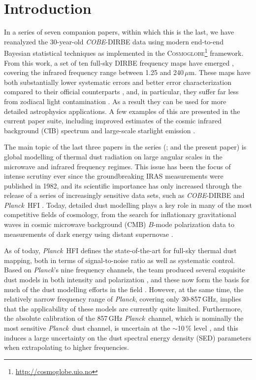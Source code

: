 \documentclass{aa}
\def\Cosmoglobe{\textsc{Cosmoglobe}}
\def\Planck{\textit{Planck}}
\def\COBE{\textit{COBE}}
\begin{document}
   
\section{Introduction}

In a series of seven companion papers, within which this is the last,
we have reanalyzed the 30-year-old \COBE-DIRBE data using modern
end-to-end Bayesian statistical techniques as implemented in the
\Cosmoglobe\footnote{\url{http://cosmoglobe.uio.no}} framework. From this work, a set of ten
full-sky DIRBE frequency maps have emerged \citep{CG02_01}, covering the infrared frequency range
between 1.25 and 240\,$\mu$m. These maps have both substantially lower
systematic errors and better error characterization compared to their
official counterparts \citep{hauser1998,CG02_01}, and, in particular,
they suffer far less from zodiacal light contamination
\citep{K98,CG02_02}. As a result they can be used for more detailed
astrophysics applications. A few examples of this are presented in the
current paper suite, including improved estimates of the cosmic infrared
background (CIB) spectrum \citep{CG02_03} and large-scale starlight emission
\citep{CG02_04}.

The main topic of the last three papers in the series (\citet{CG02_05,
  CG02_06}; and the present paper) is global modelling of thermal dust
radiation on large angular scales in the microwave and infrared
frequency regimes. This issue has been the focus of intense scrutiny
ever since the groundbreaking IRAS \citep{neugebauer:1984}
measurements were published in 1982, and its scientific importance has
only increased through the release of a series of increasingly
sensitive data sets, such as \COBE-DIRBE \citep{hauser1998} and
\Planck\ HFI \citep{planck2016-l03}. Today, detailed dust modelling
plays a key role in many of the most competitive fields of cosmology,
from the search for inflationary gravitational waves in cosmic
microwave background (CMB) $B$-mode polarization data
\citep{bicep2021} to measurements of dark energy using distant
supernovae \citep{popovic:2025}.

As of today, \Planck\ HFI defines the state-of-the-art for full-sky thermal
dust mapping, both in terms of signal-to-noise ratio as well as systematic
control. Based on \Planck's nine frequency channels, the team
produced several exquisite dust models in both intensity and
polarization
\citep{planck2013-XVII,planck2013-p06b,planck2013-XIV,planck2014-XIX,planck2014-a12,planck2014-XXII,planck2016-l11A,planck2016-l11B,planck2013-p05a},
and these now form the basis for much of the dust modelling efforts in
the field \citep[e.g.,][]{pysm2,pysm3}. However, at the same time, the
relatively narrow frequency range of \Planck, covering only 30-857\,GHz,
implies that the applicability of these models are currently quite
limited. Furthermore, the absolute calibration of the 857\,GHz \Planck\
channel, which is nominally the most sensitive \Planck\ dust channel,
is uncertain at the $\sim$10\,\% level \citep{planck2016-l03,npipe},
and this induces a large uncertainty on the dust spectral energy density (SED) parameters when
extrapolating to higher frequencies.
\end{document}
